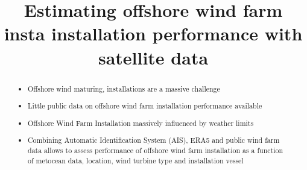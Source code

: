 \documentclass[wes, manuscript]{copernicus}
\begin{document}
\title{Estimating offshore wind farm insta installation performance with satellite data}







\received{}
\pubdiscuss{} %
\revised{}
\accepted{}
\published{}



\maketitle

\begin{abstract}

\begin{itemize}

    \item Offshore wind maturing, installations are a massive challenge
    \item Little public data on offshore wind farm installation performance available
    \item Offshore Wind Farm Installation massively influenced by weather limits
    \item Combining Automatic Identification System (AIS), ERA5 and public wind farm data allows to assess performance of
offshore wind farm installation as a function of metocean data, location, wind turbine type and installation vessel

\end{itemize}

\end{abstract}
\end{document}
